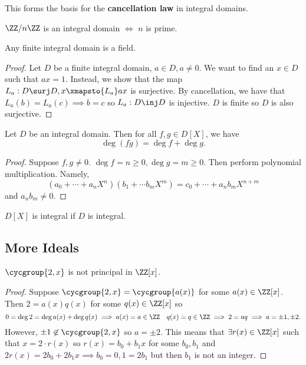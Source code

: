 \begin{rem}
This forms the basis for the \textbf{cancellation law} in integral
domains.
\end{rem}

\begin{rem}
$\ZZ / n \ZZ$ is an integral domain $\iff$ $n$ is prime.
\end{rem}

\begin{prop}
Any finite integral domain is a field.
\end{prop}

\begin{proof}
Let $D$ be a finite integral domain, $a \in D, a \neq 0$. We want to
find an $x \in D$ such that $ax = 1$. Instead, we show that the map $L_a
: D \surj D, x \xmapsto{L_a} ax$ is surjective. By cancellation, we have
that $L_a(b) = L_a(c) \implies b = c$ so $L_a : D \inj D$ is injective.
$D$ is finite so $D$ is also surjective.
\end{proof}

\begin{prop}
Let $D$ be an integral domain. Then for all $f, g \in D[X]$, we have
\[ \deg(fg) = \deg f + \deg g. \]
\end{prop}

\begin{proof}
Suppose $f, g \neq 0$. $\deg f = n \geq 0, \deg g = m \geq 0$. Then
perform polynomial multiplication. Namely,
\[ (a_0 + \cdots + a_n X^n)(b_1 + \cdots b_mX^m) = c_0 + \cdots + a_n
b_m X^{n + m} \]
and $a_n b_m \neq 0$.
\end{proof}

\begin{cor}
$D[X]$ is integral if $D$ is integral.
\end{cor}

\subsection{More Ideals}

\begin{ex}
$\cycgroup{2, x}$ is not principal in $\ZZ[x]$.
\end{ex}

\begin{proof}
Suppose $\cycgroup{2, x} = \cycgroup{a(x)}$ for some $a(x) \in \ZZ[x]$.
Then $2 = a(x) q(x)$ for some $q(x) \in \ZZ[x]$ so
\[ 0 = \deg 2 = \deg a(x) + \deg q(x) \implies a(x) = a \in \ZZ \quad
q(x) = q \in \ZZ \implies 2 = aq \implies a = \pm 1, \pm 2. \]
However, $\pm 1 \not \in \cycgroup{2, x}$ so $a = \pm 2$. This means
that $\exists r(x) \in \ZZ[x]$ such that $x = 2 \cdot r(x)$ so $r(x) =
b_0 + b_1 x$ for some $b_0, b_1$ and $2r(x) = 2b_0 + 2b_1 x \implies b_0
= 0, 1 = 2b_1$ but then $b_1$ is not an integer.
\end{proof}
